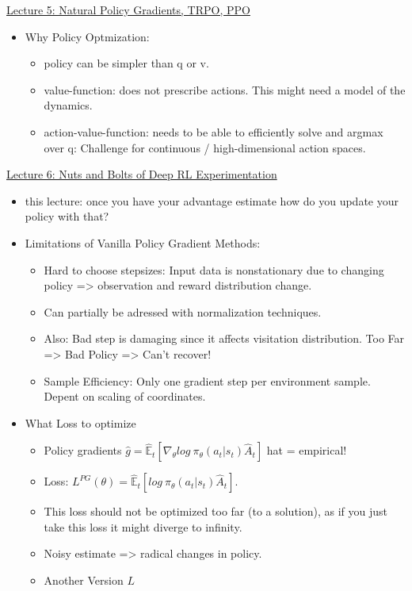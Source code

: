 \href{https://www.youtube.com/watch?v=qaMdN6LS9rA}{Lecture 5: Natural Policy Gradients, TRPO, PPO}\\
\begin{itemize}[noitemsep,nolistsep]
	\item Why Policy Optmization:
	\begin{itemize}[noitemsep,nolistsep]
		\item policy can be simpler than q or v.
		\item value-function: does not prescribe actions. This might need a model of the dynamics.
		\item action-value-function: needs to be able to efficiently solve and argmax over q: Challenge for continuous / high-dimensional action spaces.
	\end{itemize}

\end{itemize}
\href{https://www.youtube.com/watch?v=xvRrgxcpaHY}{Lecture 6: Nuts and Bolts of Deep RL Experimentation}
\begin{itemize}[noitemsep,nolistsep]
	\item this lecture: once you have your advantage estimate how do you update your policy with that?
	\item Limitations of Vanilla Policy Gradient Methods:
	\begin{itemize}[noitemsep,nolistsep]
		\item Hard to choose stepsizes: Input data is nonstationary due to changing policy => observation and reward distribution change.
		\item Can partially be adressed with normalization techniques.
		\item Also: Bad step is damaging since it affects visitation distribution. Too Far => Bad Policy => Can't recover!
		\item Sample Efficiency: Only one gradient step per environment sample. Depent on scaling of coordinates.
	\end{itemize}
	\item What Loss to optimize
	\begin{itemize}[noitemsep,nolistsep]
		\item Policy gradients $\hat{g} = \hat{\mathbb{E}}_t[\nabla_\theta log\ \pi_\theta(a_t|s_t)\hat{A}_t]$ hat = empirical!
		\item Loss: $L^{PG}(\theta) = \hat{\mathbb{E}}_t[log\ \pi_\theta(a_t|s_t)\hat{A}_t]$.
		\item This loss should not be optimized too far (to a solution), as if you just take this loss it might diverge to infinity.
		\item Noisy estimate => radical changes in policy.
		\item Another Version $L$
	\end{itemize}
\end{itemize}


